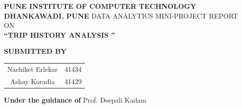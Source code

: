 \documentclass[a4paper, 12pt]{article}
\begin{document}
 
\begin{titlepage}
    \begin{center}
        \vspace*{1cm}
        
        \large
                \textbf{\MakeUppercase{Pune Institute of Computer Technology}}
                \linebreak
        \textbf{\MakeUppercase{Dhankawadi, Pune}}
        \vspace{0.5cm}
                        \linebreak
                        \linebreak
        \MakeUppercase{Data Analytics Mini-Project REPORT }
        \linebreak
        ON
        \linebreak
        \vspace{0.5cm}
        \large
        \\
        \textbf{\MakeUppercase{“TRIP HISTORY ANALYSIS​ ”}}
        \linebreak
        
        \textbf{SUBMITTED BY}
        \vspace{1cm}
        
        \begin{center}
        \begin{tabular}{ c c }
         Nachiket Erlekar & 41434 \\ 
         Ashay Koradia & 41429 
        \end{tabular}
        \end{center}
                
        \textbf{\large{Under the guidance of}}
        \linebreak
        Prof. Deepali Kadam
        \linebreak
        
        
        
        \vspace{0.8cm}
        


\end{center}
\end{titlepage}
\end{document}
